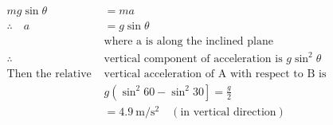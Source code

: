 \begin{enumerate}[label=\color{ocre}\textbf{\arabic*.}]
	\begin{answer}$\left. \right. $
		\begin{align*}
		m g \sin \theta&=m a\\
		\therefore \quad a&=g \sin \theta\\
		&\text{where a is along the inclined plane}\\
		\therefore\quad&\text{vertical component of acceleration is $g \sin ^{2} \theta$}\\
		\text{Then the  relative }&\text{vertical acceleration of $\mathrm{A}$ with respect to $\mathrm{B}$ is}\\
		&g\left(\sin ^{2} 60-\sin ^{2} 30\right]=\frac{g}{2}\\
		&=4.9 \mathrm{~m} / \mathrm{s}^{2}\quad
		(\text{in vertical direction})
		\end{align*}
	\end{answer}
\end{enumerate}
